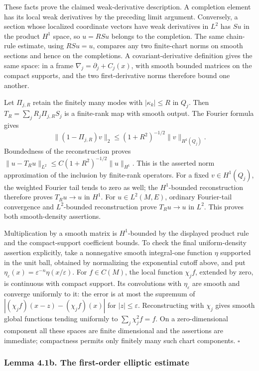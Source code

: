 \documentclass[
  11pt,
]{article}
\begin{document}
These facts prove the claimed weak-derivative description. A completion
element has its local weak derivatives by the preceding limit argument.
Conversely, a section whose localized coordinate vectors have weak
derivatives in \(L^2\) has \(Su\) in the product \(H^1\) space, so
\(u=RSu\) belongs to the completion. The same chain-rule estimate, using
\(RSu=u\), compares any two finite-chart norms on smooth sections and
hence on the completions. A covariant-derivative definition gives the
same space: in a frame \(\nabla_j=\partial_j+C_j(x)\), with smooth
bounded matrices on the compact supports, and the two first-derivative
norms therefore bound one another.

Let \(\Pi_{j,R}\) retain the finitely many modes with
\(|\kappa_k|\leq R\) in \(Q_j\). Then \(T_R=\sum_jR_j\Pi_{j,R}S_j\) is a
finite-rank map with smooth output. The Fourier formula gives \[
\|(1-\Pi_{j,R})v\|_2
\leq(1+R^2)^{-1/2}\|v\|_{H^1(Q_j)} .
\] Boundedness of the reconstruction proves
\(\|u-T_Ru\|_{L^2}\leq C(1+R^2)^{-1/2}\|u\|_{H^1}\). This is the
asserted norm approximation of the inclusion by finite-rank operators.
For a fixed \(v\in H^1(Q_j)\), the weighted Fourier tail tends to zero
as well; the \(H^1\)-bounded reconstruction therefore proves
\(T_Ru\to u\) in \(H^1\). For \(u\in L^2(M,E)\), ordinary Fourier-tail
convergence and \(L^2\)-bounded reconstruction prove \(T_Ru\to u\) in
\(L^2\). This proves both smooth-density assertions.

Multiplication by a smooth matrix is \(H^1\)-bounded by the displayed
product rule and the compact-support coefficient bounds. To check the
final uniform-density assertion explicitly, take a nonnegative smooth
integral-one function \(\eta\) supported in the unit ball, obtained by
normalizing the exponential cutoff above, and put
\(\eta_\varepsilon(x)=\varepsilon^{-n}\eta(x/\varepsilon)\). For
\(f\in C(M)\), the local function \(\chi_jf\), extended by zero, is
continuous with compact support. Its convolutions with
\(\eta_\varepsilon\) are smooth and converge uniformly to it: the error
is at most the supremum of \(|(\chi_jf)(x-z)-(\chi_jf)(x)|\) for
\(|z|\leq\varepsilon\). Reconstructing with \(\chi_j\) gives smooth
global functions tending uniformly to \(\sum_j\chi_j^2f=f\). On a
zero-dimensional component all these spaces are finite dimensional and
the assertions are immediate; compactness permits only finitely many
such chart components. \(\square\)

\subsubsection{Lemma 4.1b. The first-order elliptic
estimate}\label{lemma-4.1b.-the-first-order-elliptic-estimate}
\end{document}
